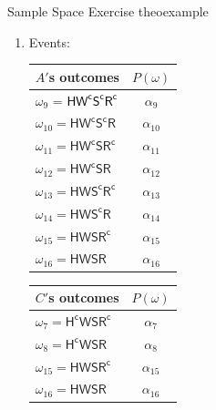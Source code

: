 \documentclass{tufte-handout}
\newcommand{\bmp}[1]{\begin{minipage}{#1}}
\newcommand{\emp}{\end{minipage}}
\newcommand{\tw}{\textwidth}
\begin{document}
\begin{mybox}{Sample Space Exercise }{theoexample}
\begin{itemize}
\begin{enumerate}
\begin{center}
\begin{tabular}{ |l|c|}
    $\omega_{11} =\mathsf{HW^cSR^c}$       & $\alpha_{11}$\\\hline
    $\omega_{12} =\mathsf{HW^cSR}$           & $\alpha_{12}$\\ \hline    
    $\omega_{13} =\mathsf{HWS^cR^c}$       & $\alpha_{13}$\\\hline
    $\omega_{14} =\mathsf{HWS^cR}$          & $\alpha_{14}$\\\hline
    $\omega_{15} =\mathsf{HWSR^c}$          & $\alpha_{15}$\\\hline     
    $\omega_{16} =\mathsf{HWSR}$             & $\alpha_{16}$\\                  
     \hline
  \end{tabular}
  \end{center}
\item  Events:
  \vspace{0.3cm}  
  
  \bmp{0.5\tw}  
  \vspace{0.3cm}
  \begin{center}
  \begin{tabular}{ |l|c|}
    \hline
     $A'$s outcomes & $P(\omega)$ \\\hline
     $\omega_{9}$ = \textcolor{black}{$\mathsf{HW^cS^cR^c}$ }   & $\alpha_9$\\ \hline    
    $\omega_{10}= \mathsf{HW^cS^cR}$       & $\alpha_{10}$\\\hline
    $\omega_{11}=\mathsf{HW^cSR^c}$       & $\alpha_{11}$\\\hline
    $\omega_{12}=\mathsf{HW^cSR}$           & $\alpha_{12}$\\ \hline    
    $\omega_{13}=\mathsf{HWS^cR^c}$       & $\alpha_{13}$\\\hline
    $\omega_{14}=\mathsf{HWS^cR}$          & $\alpha_{14}$\\\hline
    $\omega_{15}=\mathsf{HWSR^c}$          & $\alpha_{15}$\\\hline     
    $\omega_{16}=\mathsf{HWSR}$             & $\alpha_{16}$\\                  
     \hline
  \end{tabular}    
  \end{center}
  \emp  
      \bmp{0.5\tw} 
    \vspace{0.3cm}   
   \begin{center}
   \begin{tabular}{ |l|c|}
    \hline
    $C'$s outcomes& $P(\omega)$ \\\hline    
     $\omega_{7}= \mathsf{H^cWSR^c}$        & $\alpha_7$\\\hline
     $\omega_{8}=\mathsf{H^cWSR}$           & $\alpha_8$\\\hline   
     $\omega_{15}=\mathsf{HWSR^c}$          & $\alpha_{15}$\\\hline     
     $\omega_{16}=\mathsf{HWSR}$             & $\alpha_{16}$\\                  
     \hline
  \end{tabular}   
  \end{center}
  \emp


\end{enumerate}
\end{itemize}
\end{mybox}
\end{document}
